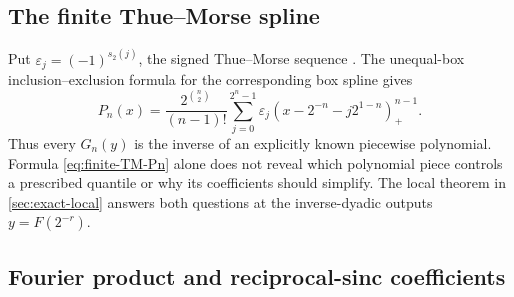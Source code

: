 \documentclass[11pt,oneside]{article}
\numberwithin{equation}{section}
\theoremstyle{definition}
\theoremstyle{remark}
\newcommand{\TM}{\varepsilon}
\newcommand{\Fn}{P_n}
\newcommand{\Gn}{G_n}
\newcommand{\pospart}[1]{\left(#1\right)_{+}}
\begin{document}
\subsection{The finite Thue--Morse spline}

Put $\TM_j=(-1)^{s_2(j)}$, the signed Thue--Morse sequence \cite{AlloucheShallit}.  The unequal-box inclusion--exclusion formula for the corresponding box spline \cite{deBoorSplines} gives
\begin{equation}
 \boxed{
 \Fn(x)=\frac{2^{\binom n2}}{(n-1)!}
 \sum_{j=0}^{2^n-1}\TM_j
 \pospart{x-2^{-n}-j2^{1-n}}^{n-1}.}
 \label{eq:finite-TM-Pn}
\end{equation}
Thus every $\Gn(y)$ is the inverse of an explicitly known piecewise polynomial.  Formula
\eqref{eq:finite-TM-Pn} alone does not reveal which polynomial piece controls a prescribed
quantile or why its coefficients should simplify.  The local theorem in \cref{sec:exact-local}
answers both questions at the inverse-dyadic outputs $y=F(2^{-r})$.

\subsection{Fourier product and reciprocal-sinc coefficients}
\end{document}
